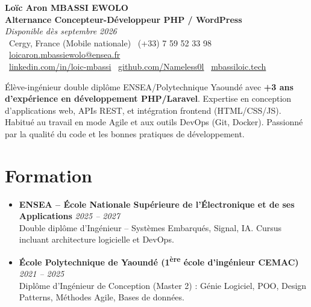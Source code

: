 \documentclass[a4paper,11pt]{article}
\begin{document}
\begin{center}
    {\Large \textbf{Loïc Aron MBASSI EWOLO}} \\ \vspace{4pt}
    \textbf{\large Alternance Concepteur-Développeur PHP / WordPress} \\
    \textit{\small Disponible dès septembre 2026} \\ \vspace{4pt}
    \small
    \faMapMarker\ Cergy, France (Mobile nationale) \quad
    \faPhone\ (+33) 7 59 52 33 98 \quad
    \faEnvelope\ \href{mailto:loicaron.mbassiewolo@ensea.fr}{loicaron.mbassiewolo@ensea.fr} \\ \vspace{2pt}
    \faLinkedin\ \href{https://www.linkedin.com/in/loic-mbassi/}{linkedin.com/in/loic-mbassi} \quad
    \faGithub\ \href{https://github.com/Nameless0l}{github.com/Nameless0l} \quad
    \faGlobe\ \href{https://mbassiloic.tech}{mbassiloic.tech}
\end{center}

\vspace{-6pt}

\noindent\small{Élève-ingénieur double diplôme ENSEA/Polytechnique Yaoundé avec \textbf{+3 ans d'expérience en développement PHP/Laravel}. Expertise en conception d'applications web, APIs REST, et intégration frontend (HTML/CSS/JS). Habitué au travail en mode Agile et aux outils DevOps (Git, Docker). Passionné par la qualité du code et les bonnes pratiques de développement.}

\section{Formation}
\begin{itemize}[leftmargin=*, label=\tiny$\bullet$, nosep]
    \item \textbf{ENSEA -- École Nationale Supérieure de l'Électronique et de ses Applications} \hfill \textit{2025 -- 2027} \\
    \small{Double diplôme d'Ingénieur -- Systèmes Embarqués, Signal, IA. Cursus incluant architecture logicielle et DevOps.}
    \item \textbf{École Polytechnique de Yaoundé (1\textsuperscript{ère} école d'ingénieur CEMAC)} \hfill \textit{2021 -- 2025} \\
    \small{Diplôme d'Ingénieur de Conception (Master 2) : Génie Logiciel, POO, Design Patterns, Méthodes Agile, Bases de données.}
\end{itemize}
\end{document}
